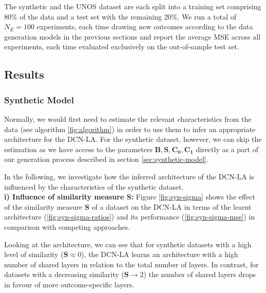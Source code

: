 The synthetic and the UNOS dataset are each split into a training set comprising 80\% of the data and a test set with the remaining 20\%. We run a total of $N_E = 100$ experiments, each time drawing new outcomes according to the data generation models in the previous sections
and report the average MSE across all experiments, each time evaluated exclusively on the out-of-sample test set. 


\subsection{Results}

\subsubsection{Synthetic Model} \label{sec:data-generation}
Normally, we would first need to estimate the relevant characteristics from the data (see algorithm \ref{fig:algorithm}) in order to use them to infer an appropriate architecture for the DCN-LA. For the synthetic dataset, however, we can skip the estimation as we have access to the parameters $\mathbf{B}, \mathbf{S}, \mathbf{C_0}, \mathbf{C_1}$ directly as a part of our generation process described in  section \ref{sec:synthetic-model}. 

In the following, we investigate how the inferred architecture of the DCN-LA is influenced by the characteristics of the synthetic dataset.  \\

\textbf{i) Influence of similarity measure S:} 
Figure \ref{fig:syn-sigma} shows the effect of the similarity measure \textbf{S} of a dataset on the DCN-LA in terms of the learnt architecture (\ref{fig:syn-sigma-ratios}) and its performance (\ref{fig:syn-sigma-mse}) in comparison with competing approaches. 

Looking at the architecture, we can see that for synthetic datasets with a high level of similarity ($\mathbf{S} \approx 0$), the DCN-LA learns an architecture with a high number of shared layers in relation to the total number of layers. In contrast, for datasets with a decreasing similarity ($\mathbf{S} \rightarrow 2$) %
the number of shared layers drops in favour of more outcome-specific layers. 

